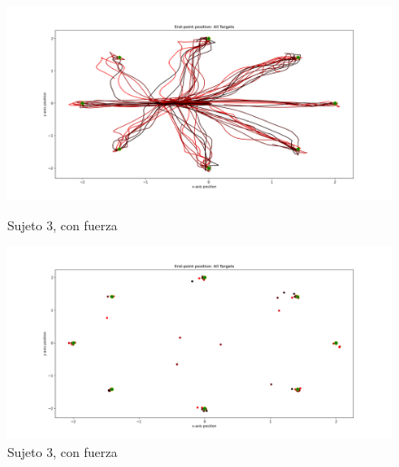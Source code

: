 \documentclass[a4paper,11pt, oneside]{book}
\begin{document}
\begin{figure}[H]
	\begin{minipage}[b]{0.5\linewidth}
		\centering
		\includegraphics[width=\linewidth]{sujeto3/force/trayectorias}
		\caption{Sujeto 3, con fuerza}
		\label{fig:figura1}
	\end{minipage}
	\hspace{0.5cm}
	\begin{minipage}[b]{0.5\linewidth}
		\centering
		\includegraphics[width=\linewidth]{sujeto3/force/trayectorias_puntos}
		\caption{Sujeto 3, con fuerza}
		\label{fig:figura2}
	\end{minipage}
\end{figure}
\end{document}
